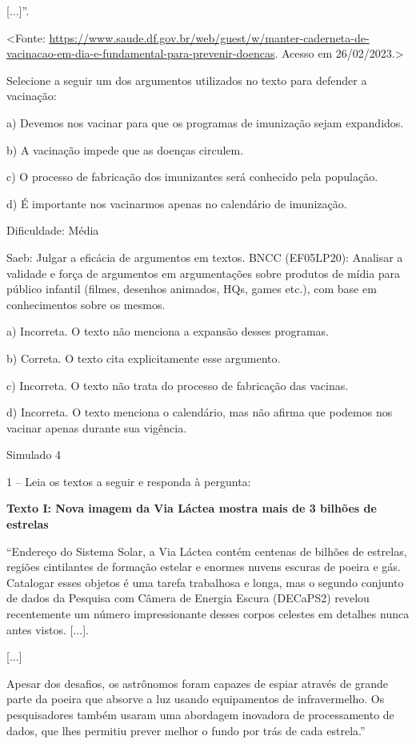{[}...{]}''.

\textless{}Fonte:
\url{https://www.saude.df.gov.br/web/guest/w/manter-caderneta-de-vacinacao-em-dia-e-fundamental-para-prevenir-doencas}.
Acesso em 26/02/2023.\textgreater{}

Selecione a seguir um dos argumentos utilizados no texto para defender a
vacinação:

a) Devemos nos vacinar para que os programas de imunização sejam
expandidos.

b) A vacinação impede que as doenças circulem.

c) O processo de fabricação dos imunizantes será conhecido pela
população.

d) É importante nos vacinarmos apenas no calendário de imunização.

Dificuldade: Média

Saeb: Julgar a eficácia de argumentos em textos. BNCC (EF05LP20):
Analisar a validade e força de argumentos em argumentações sobre
produtos de mídia para público infantil (filmes, desenhos animados, HQs,
games etc.), com base em conhecimentos sobre os mesmos.

a) Incorreta. O texto não menciona a expansão desses programas.

b) Correta. O texto cita explicitamente esse argumento.

c) Incorreta. O texto não trata do processo de fabricação das vacinas.

d) Incorreta. O texto menciona o calendário, mas não afirma que podemos
nos vacinar apenas durante sua vigência.

Simulado 4

1 -- Leia os textos a seguir e responda à pergunta:

\textbf{Texto I: Nova imagem da Via Láctea mostra mais de 3 bilhões de
estrelas}

``Endereço do Sistema Solar, a Via Láctea contém centenas de bilhões de
estrelas, regiões cintilantes de formação estelar e enormes nuvens
escuras de poeira e gás. Catalogar esses objetos é uma tarefa trabalhosa
e longa, mas o segundo conjunto de dados da Pesquisa com Câmera de
Energia Escura (DECaPS2) revelou recentemente um número impressionante
desses corpos celestes em detalhes nunca antes vistos. {[}...{]}.

{[}...{]}

Apesar dos desafios, os astrônomos foram capazes de espiar através de
grande parte da poeira que absorve a luz usando equipamentos de
infravermelho. Os pesquisadores também usaram uma abordagem inovadora de
processamento de dados, que lhes permitiu prever melhor o fundo por trás
de cada estrela.''

